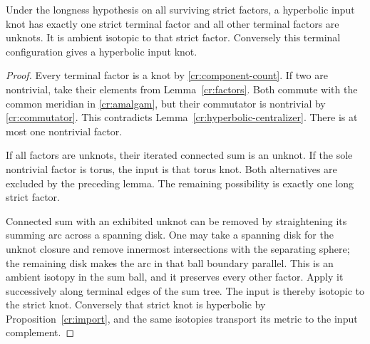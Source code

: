\begin{proposition}\label{cr:one-factor}
Under the longness hypothesis on all surviving strict factors, a hyperbolic input knot has exactly one strict terminal factor and all other terminal factors are unknots. It is ambient isotopic to that strict factor. Conversely this terminal configuration gives a hyperbolic input knot.
\end{proposition}
\begin{proof}
Every terminal factor is a knot by \eqref{cr:component-count}. If two are nontrivial, take their elements from Lemma~\ref{cr:factors}. Both commute with the common meridian in \eqref{cr:amalgam}, but their commutator is nontrivial by \eqref{cr:commutator}. This contradicts Lemma~\ref{cr:hyperbolic-centralizer}. There is at most one nontrivial factor.

If all factors are unknots, their iterated connected sum is an unknot. If the sole nontrivial factor is torus, the input is that torus knot. Both alternatives are excluded by the preceding lemma. The remaining possibility is exactly one long strict factor.

Connected sum with an exhibited unknot can be removed by straightening its summing arc across a spanning disk. One may take a spanning disk for the unknot closure and remove innermost intersections with the separating sphere; the remaining disk makes the arc in that ball boundary parallel. This is an ambient isotopy in the sum ball, and it preserves every other factor. Apply it successively along terminal edges of the sum tree. The input is thereby isotopic to the strict knot. Conversely that strict knot is hyperbolic by Proposition~\ref{cr:import}, and the same isotopies transport its metric to the input complement.
\end{proof}
